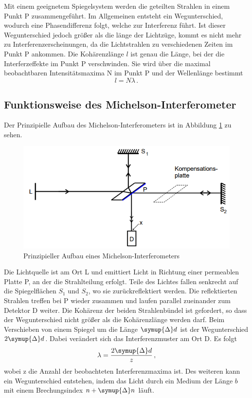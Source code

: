 Mit einem geeignetem Spiegelsystem werden die geteilten Strahlen in einem Punkt P zusammengeführt. Im Allgemeinen entsteht ein Wegunterschied, wodurch eine Phasendifferenz folgt, welche zur Interferenz führt.
Ist dieser Wegunterschied jedoch größer als die länge der Lichtzüge, kommt es nicht mehr zu Interferenzerscheinungen, da die Lichtstrahlen zu verschiedenen Zeiten im Punkt P ankommen.
Die Kohärenzlänge $l$ ist genau die Länge, bei der die Interferzeffekte im Punkt P verschwinden.
Sie wird über die maximal beobachtbaren Intensitätsmaxima N im Punkt P und der Wellenlänge bestimmt
\begin{equation*}
    l=N \lambda \, .
\end{equation*}
\subsection{Funktionsweise des Michelson-Interferometer}
Der Prinzipielle Aufbau des Michelson-Interferometers ist in Abbildung \ref{fig:mi} zu sehen.
\begin{figure}
    \centering
    \caption{Prinzipieller Aufbau eines Michelson-Interferometers \cite{v401}}
    \label{fig:mi}
    \includegraphics[width = 0.5 \textwidth]{pics/michelsoi.png}
\end{figure}
Die Lichtquelle ist am Ort L und emittiert Licht in Richtung einer permeablen Platte P, an der die Strahlteilung erfolgt.
Teile des Lichtes fallen senkrecht auf die Spiegelflächen $S_1$ und $S_2$, wo sie zurückreflektiert werden. Die reflektierten Strahlen treffen bei P wieder zusammen und laufen parallel zueinander zum Detektor D weiter.
Die Kohärenz der beiden Strahlenbündel ist gefordert, so dass der Wegunterschied nicht größer als die Kohärenzlänge werden darf. Beim Verschieben von einem Spiegel um die Länge $\symup{\Delta} d$ 
ist der Wegunterschied $2\symup{\Delta} d$. Dabei verändert sich das Interferenzmuster am Ort D. Es folgt 
\begin{equation}
    \lambda=\frac{2 \symup{\Delta} d}{z} \, ,
    \label{eqn:wel}
\end{equation}
wobei z die Anzahl der beobachteten Interferenzmaxima ist. Des weiteren kann ein Wegunterschied entstehen, indem das Licht durch ein Medium der Länge $b$ mit einem Brechungsindex $n+ \symup{\Delta} n$ läuft.
